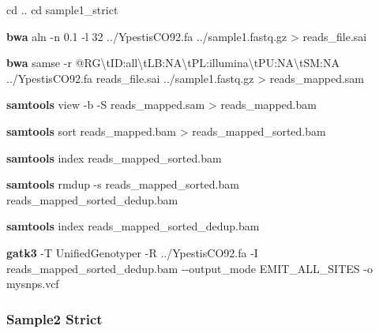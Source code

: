 \documentclass[
  letterpaper,
]{book}
\newenvironment{Shaded}{}{}
\newcommand{\AttributeTok}[1]{\textcolor[rgb]{0.84,0.23,0.29}{#1}}
\newcommand{\BuiltInTok}[1]{\textcolor[rgb]{0.84,0.23,0.29}{#1}}
\newcommand{\ExtensionTok}[1]{\textcolor[rgb]{0.84,0.23,0.29}{\textbf{#1}}}
\newcommand{\NormalTok}[1]{\textcolor[rgb]{0.14,0.16,0.18}{#1}}
\newcommand{\OperatorTok}[1]{\textcolor[rgb]{0.14,0.16,0.18}{#1}}
\newcommand{\StringTok}[1]{\textcolor[rgb]{0.01,0.18,0.38}{#1}}
\begin{document}
\begin{Shaded}
\begin{Highlighting}[]
\BuiltInTok{cd}\NormalTok{ ..}
\BuiltInTok{cd}\NormalTok{ sample1\_strict}

\ExtensionTok{bwa}\NormalTok{ aln }\AttributeTok{{-}n}\NormalTok{ 0.1 }\AttributeTok{{-}l}\NormalTok{ 32 ../YpestisCO92.fa ../sample1.fastq.gz }\OperatorTok{\textgreater{}}\NormalTok{ reads\_file.sai}

\ExtensionTok{bwa}\NormalTok{ samse }\AttributeTok{{-}r} \StringTok{\textquotesingle{}@RG\textbackslash{}tID:all\textbackslash{}tLB:NA\textbackslash{}tPL:illumina\textbackslash{}tPU:NA\textbackslash{}tSM:NA\textquotesingle{}}\NormalTok{ ../YpestisCO92.fa reads\_file.sai ../sample1.fastq.gz }\OperatorTok{\textgreater{}}\NormalTok{ reads\_mapped.sam}

\ExtensionTok{samtools}\NormalTok{ view }\AttributeTok{{-}b} \AttributeTok{{-}S}\NormalTok{ reads\_mapped.sam }\OperatorTok{\textgreater{}}\NormalTok{ reads\_mapped.bam}

\ExtensionTok{samtools}\NormalTok{ sort reads\_mapped.bam }\OperatorTok{\textgreater{}}\NormalTok{ reads\_mapped\_sorted.bam}

\ExtensionTok{samtools}\NormalTok{ index reads\_mapped\_sorted.bam}

\ExtensionTok{samtools}\NormalTok{ rmdup }\AttributeTok{{-}s}\NormalTok{ reads\_mapped\_sorted.bam reads\_mapped\_sorted\_dedup.bam}

\ExtensionTok{samtools}\NormalTok{ index reads\_mapped\_sorted\_dedup.bam}

\ExtensionTok{gatk3} \AttributeTok{{-}T}\NormalTok{ UnifiedGenotyper }\AttributeTok{{-}R}\NormalTok{ ../YpestisCO92.fa }\AttributeTok{{-}I}\NormalTok{ reads\_mapped\_sorted\_dedup.bam }\AttributeTok{{-}{-}output\_mode}\NormalTok{ EMIT\_ALL\_SITES }\AttributeTok{{-}o}\NormalTok{ mysnps.vcf}
\end{Highlighting}
\end{Shaded}

\hypertarget{sample2-strict}{%
\subsubsection{Sample2 Strict}\label{sample2-strict}}
\end{document}
